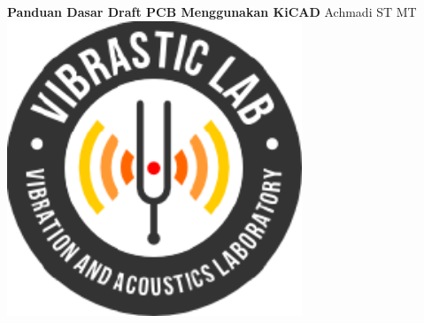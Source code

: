 \documentclass[12pt]{book}
\date{}
\begin{document}
	
	\frontmatter
	\begin{titlepage}
		\centering
		{\LARGE \bf Panduan Dasar Draft PCB Menggunakan KiCAD}
		\vfill
		{\Large Achmadi ST MT}
		\vfill
		\includegraphics[width=250pt]{images/logo/logoviblab}
		\vfill
		\vfill
	\end{titlepage}
	
	
	\newpage
	\tableofcontents
	
	
\end{document}
